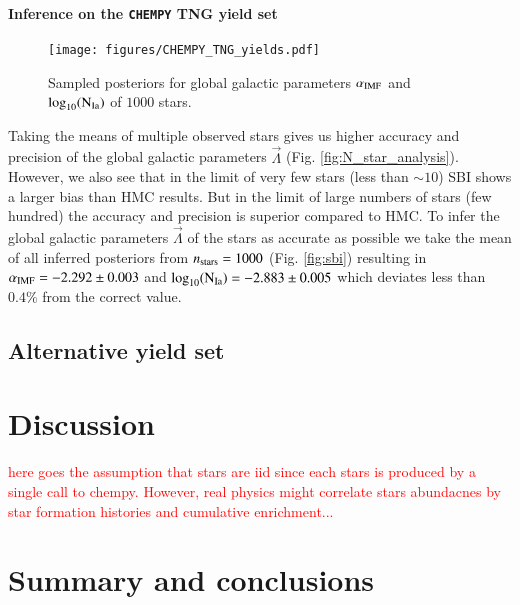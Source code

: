 \documentclass{aa}
\begin{document}
\paragraph{Inference on the \texttt{CHEMPY} TNG yield set}

\begin{figure}
    \centering
    \texttt{[image: figures/CHEMPY\_TNG\_yields.pdf]}
    \vspace{-.25cm}
    \caption{Sampled posteriors for global galactic parameters $\alpha_{\rm IMF}$ and $\log_{10}(\rm N_{Ia})$ of $1000$ stars.}
    \label{fig:CHEMPY_TNG_sbi} 
\end{figure}

%
Taking the means of multiple observed stars gives us higher accuracy and precision of the global galactic parameters $\vec\Lambda$ (Fig. \ref{fig:N_star_analysis}). However, we also see that in the limit of very few stars (less than $\sim10$) SBI shows a larger bias than HMC results. But in the limit of large numbers of stars (few hundred) the accuracy and precision is superior compared to HMC.
%
To infer the global galactic parameters $\vec\Lambda$ of the stars as accurate as possible we take the mean of all inferred posteriors from $n_{\rm stars}=1000$ (Fig. \ref{fig:sbi}) resulting in $\alpha_{\rm IMF}=-2.292\pm0.003$ and $\log_{10}(\rm N_{Ia})=-2.883\pm0.005$ which deviates less than $0.4\%$ from the correct value.


\subsection{Alternative yield set}
\label{subsec: mocks_wrong_yield}

\section{Discussion}
\label{sec: conclusion}

\textcolor{red}{here goes the assumption that stars are iid since each stars is produced by a single call to chempy. However, real physics might correlate stars abundacnes by star formation histories and cumulative enrichment...}

\section{Summary and conclusions}
\label{sec: conclusion}
\end{document}
